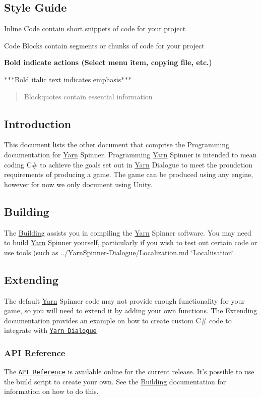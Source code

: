 \subsection*{Style Guide}

{\ttfamily Inline Code} contain short snippets of code for your project \begin{DoxyVerb}Code Blocks contain segments or chunks of code for your project
\end{DoxyVerb}


{\bfseries Bold indicate actions (Select menu item, copying file, etc.)}

$\ast$$\ast$$\ast$\-Bold italic text indicates emphasis$\ast$$\ast$$\ast$

\begin{quotation}
Blockquotes contain essential information

\end{quotation}


\subsection*{Introduction}

This document lists the other document that comprise the Programming documentation for \hyperlink{a00040}{Yarn} Spinner. Programming \hyperlink{a00040}{Yarn} Spinner is intended to mean coding C\# to achieve the goals set out in \hyperlink{a00040}{Yarn} Dialogue to meet the proudction requirements of producing a game. The game can be produced using any engine, however for now we only document using Unity.

\subsection*{Building}

The \hyperlink{a00119}{Building} assists you in compiling the \hyperlink{a00040}{Yarn} Spinner software. You may need to build \hyperlink{a00040}{Yarn} Spinner yourself, particularly if you wish to test out certain code or use tools (such as ../\-Yarn\-Spinner-\/\-Dialogue/\-Localization.md \char`\"{}\-Localiisation\char`\"{}.

\subsection*{Extending}

The default \hyperlink{a00040}{Yarn} Spinner code may not provide enough functionality for your game, so you will need to extend it by adding your own functions. The \hyperlink{a00120}{Extending} documentation provides an example on how to create custom C\# code to integrate with \href{../YarnSpinner-Dialogue/}{\tt Yarn Dialogue}

\subsubsection*{A\-P\-I Reference}

The \href{https://thesecretlab.github.io/YarnSpinner/html/}{\tt A\-P\-I Reference} is available online for the current release. It's possible to use the build script to create your own. See the \hyperlink{a00119}{Building} documentation for information on how to do this. 